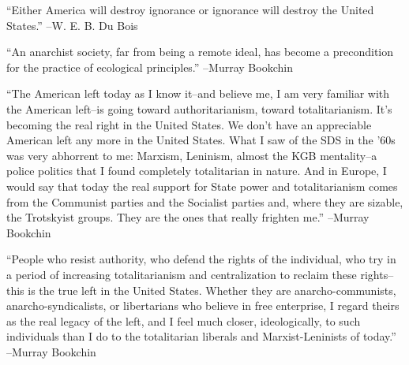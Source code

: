 \documentclass{article}%
\begin{document}
\linebreak%
\vspace{1mm}%
\begin{minipage}{\textwidth}%
\flushleft%
“Either America will destroy ignorance or ignorance will destroy the United States.”%
\linebreak%
\vspace{1mm}%
–W. E. B. Du Bois%
\linebreak%
\vspace{1mm}%
\end{minipage}%
\linebreak%
\vspace{1mm}%
\begin{minipage}{\textwidth}%
\flushleft%
“An anarchist society, far from being a remote ideal, has become a precondition for the practice of ecological principles.”%
\linebreak%
\vspace{1mm}%
–Murray Bookchin%
\linebreak%
\vspace{1mm}%
\end{minipage}%
\linebreak%
\vspace{1mm}%
\begin{minipage}{\textwidth}%
\flushleft%
“The American left today as I know it–and believe me, I am very familiar with the American left–is going toward authoritarianism, toward totalitarianism. It's becoming the real right in the United States. We don't have an appreciable American left any more in the United States. What I saw of the SDS in the '60s was very abhorrent to me: Marxism, Leninism, almost the KGB mentality–a police politics that I found completely totalitarian in nature. And in Europe, I would say that today the real support for State power and totalitarianism comes from the Communist parties and the Socialist parties and, where they are sizable, the Trotskyist groups. They are the ones that really frighten me.”%
\linebreak%
\vspace{1mm}%
–Murray Bookchin%
\linebreak%
\vspace{1mm}%
\end{minipage}%
\linebreak%
\vspace{1mm}%
\begin{minipage}{\textwidth}%
\flushleft%
“People who resist authority, who defend the rights of the individual, who try in a period of increasing totalitarianism and centralization to reclaim these rights–this is the true left in the United States. Whether they are anarcho{-}communists, anarcho{-}syndicalists, or libertarians who believe in free enterprise, I regard theirs as the real legacy of the left, and I feel much closer, ideologically, to such individuals than I do to the totalitarian liberals and Marxist{-}Leninists of today.”%
\linebreak%
\vspace{1mm}%
–Murray Bookchin%
\linebreak%
\vspace{1mm}%
\end{minipage}%
\end{document}
